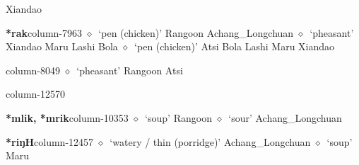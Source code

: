          Xiandao 
  \item {\footnotesize \textbf{*rak}}{\tiny column-7963}
         $\diamond$~`pen (chicken)'
         Rangoon 
\hspace{1ex}
         Achang\_Longchuan 
\hspace{1ex}
         $\diamond$~`pheasant'
         Xiandao 
\hspace{1ex}
         Maru 
\hspace{1ex}
         Lashi 
\hspace{1ex}
         Bola 
\hspace{1ex}
         $\diamond$~`pen (chicken)'
         Atsi 
\hspace{1ex}
         Bola 
\hspace{1ex}
         Lashi 
\hspace{1ex}
         Maru 
\hspace{1ex}
         Xiandao 
  \item {\footnotesize \textbf{}}{\tiny column-8049}
         $\diamond$~`pheasant'
         Rangoon 
\hspace{1ex}
         Atsi 
  \item {\footnotesize \textbf{}}{\tiny column-12570}
  \item {\footnotesize \textbf{*mlik, *mrik}}{\tiny column-10353}
         $\diamond$~`soup'
         Rangoon 
\hspace{1ex}
         $\diamond$~`sour'
         Achang\_Longchuan 
  \item {\footnotesize \textbf{*riŋH}}{\tiny column-12457}
         $\diamond$~`watery / thin (porridge)'
         Achang\_Longchuan 
\hspace{1ex}
         $\diamond$~`soup'
         Maru 
\hspace{1ex}
